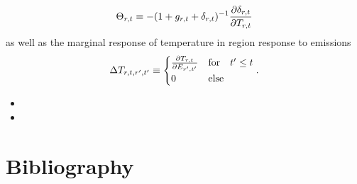 \documentclass[preprint,3p,authoryear]{elsarticle}
\begin{document}
\begin{equation}
  \label{eq:Theta}
  \Theta_{r,t}\equiv - (1+g_{r,t}+\delta_{r,t})^{-1}\frac{\partial\delta_{r,t}}{\partial T_{r,t}}
\end{equation}
as well as the marginal response of temperature in region response to emissions
\begin{equation}
  \label{eq:DeltaT}
  \Delta T_{r,t,r',t'}\equiv\begin{cases}
    \frac{\partial T_{r,t}}{\partial E_{r',t'}} & \text{for}\quad t'\leq t\\
    0 & \text{else}
  \end{cases}.
\end{equation}
\begin{itemize}
\item {}
\item {}
\end{itemize}



\section*{Bibliography}
%

\end{document}
